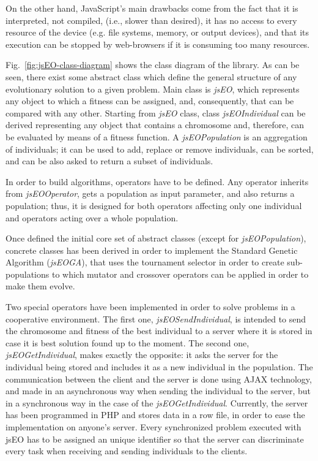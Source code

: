 \documentclass[runningheads,a4paper]{llncs}
\begin{document}
On the other hand, JavaScript's main drawbacks come from the fact that it is interpreted, not compiled, (i.e., slower than desired), it has no access to every resource of the device (e.g. file systems,  memory, or output devices), and that its execution can be stopped by web-browsers if it is consuming too many resources.

Fig.~\ref{fig:jsEO-class-diagram} shows the class diagram of the library. As can be seen, there exist some abstract class which define the general structure of any evolutionary solution to a given problem. Main class is \textit{jsEO}, which represents any object to which a fitness can be assigned, and, consequently, that can be compared with any other. Starting from \textit{jsEO} class, class \textit{jsEOIndividual} can be derived representing any object that contains a chromosome and, therefore, can be evaluated by means of a fitness function. A \textit{jsEOPopulation} is an aggregation of individuals; it can be used to add, replace or remove individuals, can be sorted, and can be also asked to return a subset of individuals.

In order to build algorithms, operators have to be defined. Any operator inherits from \textit{jsEOOperator}, gets a population as input parameter, and also returns a population; thus, it is designed for both operators affecting only one individual and operators acting over a whole population.

Once defined the initial core set of abstract classes (except for \textit{jsEOPopulation}), concrete classes has been derived in order to implement the Standard Genetic Algorithm (\textit{jsEOGA}), that uses the tournament selector in order to create sub-populations to which mutator and crossover operators can be applied in order to make them evolve.

Two special operators have been implemented in order to solve problems in a cooperative environment. The first one, \textit{jsEOSendIndividual}, is intended to send the chromosome and fitness of the best individual to a server where it is stored in case it is best solution found up to the moment. The second one, \textit{jsEOGetIndividual}, makes exactly the opposite: it asks the server for the individual being stored and includes it as a new individual in the population. The communication between the client and the server is done using AJAX technology, and made in an asynchronous way when sending the individual to the server, but in a synchronous way in the case of the \textit{jsEOGetIndividual}. Currently, the server has been programmed in PHP and stores data in a row file, in order to ease the implementation on anyone's server. Every synchronized problem executed with jsEO has to be assigned an unique identifier so that the server can discriminate every task when receiving and sending individuals to the clients.
\end{document}
